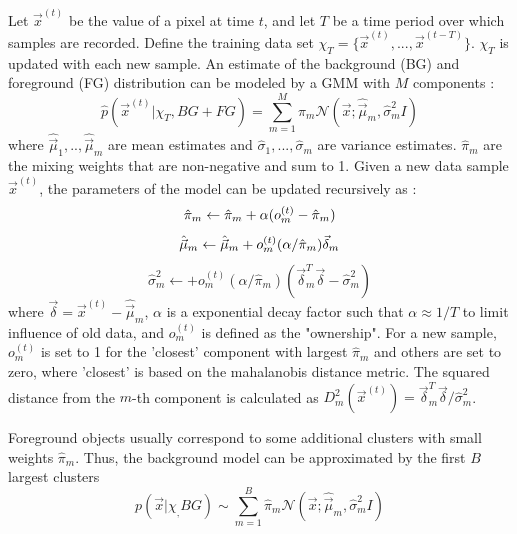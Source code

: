 \documentclass[10pt]{article} %
\begin{document}
Let $\vec{x}^{(t)}$ be the value of a pixel at time $t$, and let $T$ be a time period over which samples are recorded. Define the training data set $\chi_T = \{\vec{x}^{(t)}, ... ,\vec{x}^{(t-T)}\} $. $\chi_T$ is updated with each new sample. An estimate of the background (BG) and foreground (FG) distribution can be modeled by a GMM with $M$ components :
\begin{equation}
\hat{p}(\vec{x}^{(t)} | \chi_T , BG+FG) = \sum_{m=1}^M \hat{\pi}_m \mathcal{N}(\vec{x} ; \hat{\vec{\mu}}_m ,  \hat{\sigma}_m^2 I)
\end{equation}
where $\hat{\vec{\mu}}_1 , .. , \hat{\vec{\mu}}_m$ are mean estimates and $\hat{\sigma}_1 , ... , \hat{\sigma}_m$ are variance estimates. $\hat{\pi}_m$ are the mixing weights that are non-negative and sum to 1. Given a new data sample $\vec{x}^{(t)}$, the parameters of the model can be updated recursively as \cite{zivkovic2}:
\begin{equation}
\hat{\pi}_m \leftarrow \hat{\pi}_m + \alpha ( o_m^{(t)} - \hat{\pi}_m) \\
\end{equation}
\begin{equation}
\hat{\vec{\mu}}_m \leftarrow \hat{\vec{\mu}}_m + o_m^{(t)} (\alpha / \hat{\pi}_m) \vec{\delta}_m \\
\end{equation}
\begin{equation}
\hat{\sigma}_m^2 \leftarrow + o_m^{(t)} (\alpha / \hat{\pi}_m)(  \vec{\delta}_m^T  \vec{\delta} - \hat{\sigma}_m^2)
\end{equation}
where $\vec{\delta} = \vec{x}^{(t)} - \hat{\vec{\mu}}_m$,  $\alpha$ is a exponential decay factor such that $\alpha \approx 1/T$ to limit influence of old data, and $o_m^{(t)}$ is defined as the "ownership". For a new sample, $o_m^{(t)}$ is set to 1 for the 'closest' component with largest $\hat{\pi}_m$ and others are set to zero, where 'closest' is based on the mahalanobis distance metric. The squared distance from the $m$-th component is calculated as $D_m^2 ( \vec{x}^{(t)}) = \vec{\delta}_m^T  \vec{\delta} / \hat{\sigma}_m^2$. 

Foreground objects usually correspond to some additional clusters with small weights $\hat{\pi}_m$. Thus, the background model can be approximated by the first $B$ largest clusters
\begin{equation}
p(\vec{x} | \chi_ , BG) \sim \sum_{m=1}^B \hat{\pi}_m \mathcal{N}(\vec{x} ; \hat{\vec{\mu}}_m ,  \hat{\sigma}_m^2 I)
\end{equation}
\end{document}
